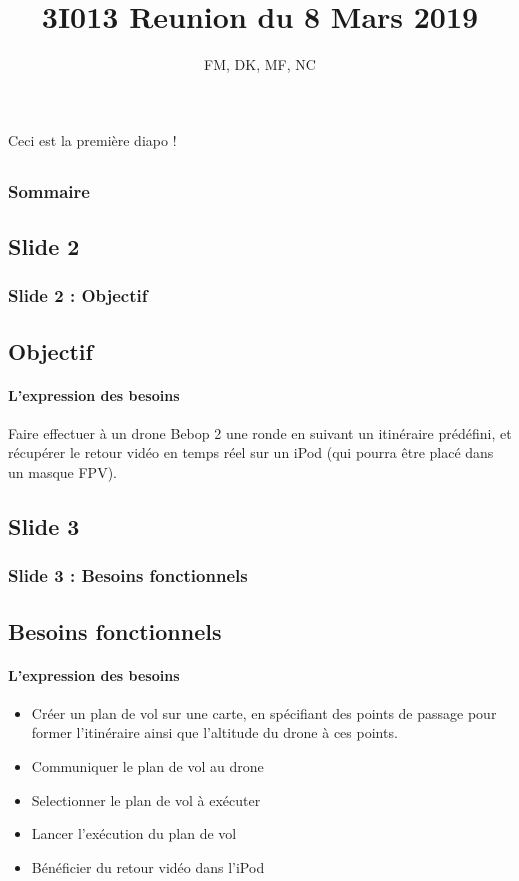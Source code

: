 \documentclass{beamer}
\title{3I013 Reunion du 8 Mars 2019}
\author{FM, DK, MF, NC}
\begin{document}
	\begin{frame}
		\begin{center}
		\maketitle
		Ceci est la première diapo !\\
		\end{center}
	\end{frame}
	
	
	
	\begin{frame}
		\section{}
		\begin{flushleft}
		\frametitle{Sommaire}
		\tableofcontents{}
		\end{flushleft}
	\end{frame}
	
	
	\begin{frame}
	\section{Slide 2}
		\begin{center}
		\frametitle{Slide 2 : Objectif}
		\subsection{Objectif}
        \framesubtitle{L'expression des besoins}
		   Faire effectuer à un drone Bebop 2 une ronde en suivant un itinéraire prédéfini, et récupérer le retour vidéo en temps réel sur un iPod (qui pourra être placé dans un masque FPV).
		\end{center}
	\end{frame}
	
	\begin{frame}
	\section{Slide 3}
		\begin{center}
		\frametitle{Slide 3 : Besoins fonctionnels}
		\subsection{Besoins fonctionnels}
        \framesubtitle{L'expression des besoins}
		\begin{itemize}
		    \item Créer un plan de vol sur une carte, en spécifiant des points de passage pour former l'itinéraire ainsi que l'altitude du drone à ces points.
		    \item Communiquer le plan de vol au drone
		    \item Selectionner le plan de vol à exécuter
		    \item Lancer l'exécution du plan de vol
		    \item Bénéficier du retour vidéo dans l'iPod
		\end{itemize}
		\end{center}
	\end{frame}
	
\end{document}

